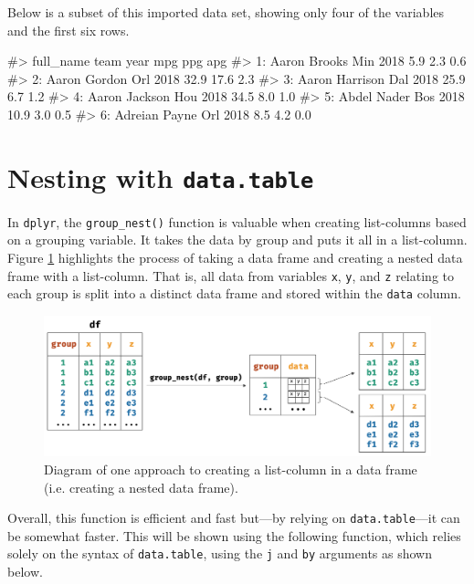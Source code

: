 \noindent Below is a subset of this imported data set, showing only four
of the variables and the first six rows.

\begin{Schunk}
\begin{Soutput}
#>         full_name team year  mpg  ppg apg
#> 1:   Aaron Brooks  Min 2018  5.9  2.3 0.6
#> 2:   Aaron Gordon  Orl 2018 32.9 17.6 2.3
#> 3: Aaron Harrison  Dal 2018 25.9  6.7 1.2
#> 4:  Aaron Jackson  Hou 2018 34.5  8.0 1.0
#> 5:    Abdel Nader  Bos 2018 10.9  3.0 0.5
#> 6:  Adreian Payne  Orl 2018  8.5  4.2 0.0
\end{Soutput}
\end{Schunk}

\hypertarget{nesting-with-data.table}{%
\section{\texorpdfstring{Nesting with
\texttt{data.table}}{Nesting with data.table}}\label{nesting-with-data.table}}

In \texttt{dplyr}, the \texttt{group\_nest()} function is valuable when
creating list-columns based on a grouping variable. It takes the data by
group and puts it all in a list-column. Figure \ref{process} highlights
the process of taking a data frame and creating a nested data frame with
a list-column. That is, all data from variables \texttt{x}, \texttt{y},
and \texttt{z} relating to each group is split into a distinct data
frame and stored within the \texttt{data} column.

\begin{figure}[b]
  \centering
  \includegraphics[width=\textwidth]{fig_process.png}
  \caption{Diagram of one approach to creating a list-column in a data frame (i.e. creating a nested data frame).}
  \label{process}
\end{figure}

Overall, this function is efficient and fast but---by relying on
\texttt{data.table}---it can be somewhat faster. This will be shown
using the following function, which relies solely on the syntax of
\texttt{data.table}, using the \texttt{j} and \texttt{by} arguments as
shown below.


